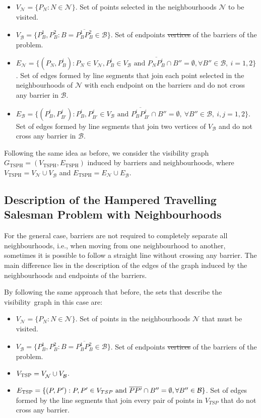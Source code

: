 \documentclass[a4paper,  review, authoryear, 1p.]{elsarticle}
\newcommand{\TSPN}{{\sf{H-TSPN}\xspace }}
\newcommand{\B}{{\mathcal B}}
\newcommand{\VB}{{V^{}_{\mathcal B}}}
\newcommand{\EB}{{E^{}_{\mathcal B}}}
\newcommand{\VN}{{V^{}_{\mathcal N}}}
\newcommand{\EN}{{E^{}_{\mathcal N}}}
\newcommand{\GTSPH}{{G_{\text{TSPH}}}}
\newcommand{\VTSPH}{{V_{\text{TSPH}}}}
\newcommand{\ETSPH}{{E_{\text{TSPH}}}}
\newcommand{\JP}[1]{{\color{armygreen}#1}}
\newcommand{\CV}[1]{{\color{red}#1}}
\begin{document}
	\begin{itemize}
		\item $\VN=\{P_N:N\in\mathcal N\}$. Set of points selected in the neighbourhoods $\mathcal N$ to be visited.
		\item $\VB=\{P^1_B, P^2_B:B=\overline{P^1_B P^2_B}\in \mathcal B\}$. Set of \JP{endpoints \sout{vertices}} of the barriers of the problem.
		\item $\EN=\{(P_N, P^i_{B}):P_N\in\VN, P^i_B\in V_\B\text{ and } \overline{P_NP^i_B}\cap B''=\emptyset,\forall B''\in\B,\:i=1,2\}$. Set of edges formed by line segments that join each point selected in the neighbourhoods of $\mathcal N$ with each endpoint on the barriers and do not cross any barrier in $\B$.
		\item $\EB=\{(P^{i}_B, P^{j}_{B'}):P^i_B, P^j_{B'}\in \VB \text{ and } \overline{P^i_B P^j_{B'}}\cap B''=\emptyset,\:\forall B''\in\mathcal B,\:i, j=1,2\}$. Set of edges formed by line segments that join two vertices of $V_{\mathcal B}$ and do not cross any barrier in $\B$.
	\end{itemize} 
	
	Following the same idea as before, we consider the \CV{visibility} graph $\GTSPH=(\VTSPH,\ETSPH)$ induced by barriers and neighbourhoods, where $\VTSPH=\VN\cup\VB$ and $\ETSPH=\EN\cup\EB$.
	
	
	\subsection{Description of the Hampered Travelling Salesman Problem with Neighbourhoods}
	For the general case, barriers are not required to completely separate all neighbourhoods, i.e., when moving from one neighbourhood to another, sometimes it is possible to follow a straight line without crossing any barrier. The main difference lies in the description of the edges of the graph induced by the neighbourhoods and endpoints of the barriers.
	
	By following the same approach that before, the sets that describe the \JP{visibility} graph in this case are:
	
	\begin{itemize}
		\item $\VN=\{P_N:N\in\mathcal N\}$. Set of points in the neighbourhoods $\mathcal N$ that must be visited.
		\item $\VB=\{P^1_B, P^2_B:B=\overline{P^1_B P^2_B}\in \mathcal B\}$. Set of \JP{endpoints \sout{vertices}} of the barriers of the problem.
		\item $V_{\rm TSP} = \VN \cup \VB$.
		\item $E_{\rm TSP}=\{(P, P'):P, P' \in V_{TSP} \text{ and } \overline{PP'}\cap B''=\emptyset,\forall B''\in\B\}$. Set of edges formed by the line segments that join every pair of points in $V_{TSP}$ that do not cross any barrier.
	\end{itemize} 
	
\end{document}
